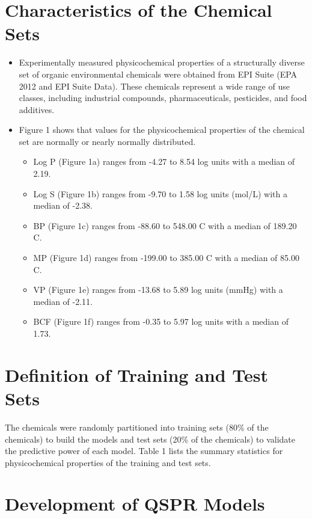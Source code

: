\documentclass[10pt, letter]{report}
\renewcommand{\=}{\, =\, }
\newcommand{\+}{\, +\, }
\renewcommand{\-}{\, -\, }
\begin{document}
\chapter{Characteristics of the Chemical Sets}

\begin{itemize}
\item Experimentally measured physicochemical properties of a structurally diverse set
of organic environmental chemicals were obtained from EPI Suite (EPA 2012 and
EPI Suite Data). These chemicals represent a wide range of use classes,
including industrial compounds, pharmaceuticals, pesticides, and food additives.
\item Figure 1 shows that values for the physicochemical properties of the chemical
set are normally or nearly normally distributed.
\begin{itemize}
\item Log P (Figure 1a) ranges from -4.27 to 8.54 log units with a median of 2.19.
\item Log S (Figure 1b) ranges from -9.70 to 1.58 log units (mol/L) with a median
of -2.38.
\item BP (Figure 1c) ranges from -88.60 to 548.00 C with a median of 189.20 C.
\item MP (Figure 1d) ranges from -199.00 to 385.00 C with a median of 85.00 C.
\item VP (Figure 1e) ranges from -13.68 to 5.89 log units (mmHg) with a median of
-2.11.
\item BCF (Figure 1f) ranges from -0.35 to 5.97 log units with a median of 1.73.
\end{itemize}
\end{itemize}

\chapter{Definition of Training and Test Sets}

The chemicals were randomly partitioned into training sets (80\% of the
chemicals) to build the models and test sets (20\% of the chemicals) to validate
the predictive power of each model. Table 1 lists the summary statistics for physicochemical properties of the training
and test sets.


\chapter{Development of QSPR Models}
\end{document}
